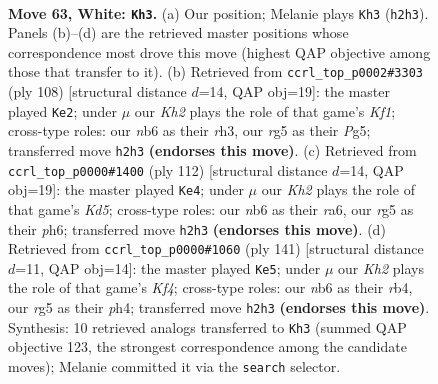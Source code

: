 \documentclass[11pt]{article}
\begin{document}
\clearpage

\begin{figure}[p]\centering
\begin{subfigure}{0.46\textwidth}\centering
\resizebox{\linewidth}{!}{%
\newchessgame
\chessboard[
  setfen={6k1/8/1n6/6rp/p2R4/P7/7K/8 w - - 3 63},
  showmover=false,
  pgfstyle=straightmove, color=movearrow, markmove={h2-h3}
]}
\caption{}
\end{subfigure}\hfill
\begin{subfigure}{0.46\textwidth}\centering
\resizebox{\linewidth}{!}{%
\newchessgame
\chessboard[
  setfen={8/6k1/4R3/6P1/7p/4p2r/8/5K2 w - - 0 55},
  showmover=false,
  pgfstyle=straightmove, color=movearrow, markmove={f1-e2}
]}
\caption{}
\end{subfigure}
\\[4pt]
\begin{subfigure}{0.46\textwidth}\centering
\resizebox{\linewidth}{!}{%
\newchessgame
\chessboard[
  setfen={6k1/8/r4p1p/3K3P/8/5R2/8/8 w - - 0 57},
  showmover=false,
  pgfstyle=straightmove, color=movearrow, markmove={d5-e4}
]}
\caption{}
\end{subfigure}\hfill
\begin{subfigure}{0.46\textwidth}\centering
\resizebox{\linewidth}{!}{%
\newchessgame
\chessboard[
  setfen={8/8/8/5k1p/PR5P/4K3/r7/8 b - - 1 71},
  showmover=false,
  pgfstyle=straightmove, color=movearrow, markmove={f5-e5}
]}
\caption{}
\end{subfigure}
\caption{\textbf{Move 63, White: \texttt{Kh3}.} (a) Our position; Melanie plays \texttt{Kh3} (\texttt{h2h3}). Panels (b)--(d) are the retrieved master positions whose correspondence most drove this move (highest QAP objective among those that transfer to it). (b) Retrieved from \texttt{ccrl\_top\_p0002\#3303} (ply 108) [structural distance $d$=14, QAP obj=19]: the master played \texttt{Ke2}; under $\mu$ our \emph{Kh2} plays the role of that game's \emph{Kf1}; cross-type roles: our \emph{n}b6 as their \emph{r}h3, our \emph{r}g5 as their \emph{P}g5; transferred move \texttt{h2h3} \textbf{(endorses this move)}. (c) Retrieved from \texttt{ccrl\_top\_p0000\#1400} (ply 112) [structural distance $d$=14, QAP obj=19]: the master played \texttt{Ke4}; under $\mu$ our \emph{Kh2} plays the role of that game's \emph{Kd5}; cross-type roles: our \emph{n}b6 as their \emph{r}a6, our \emph{r}g5 as their \emph{p}h6; transferred move \texttt{h2h3} \textbf{(endorses this move)}. (d) Retrieved from \texttt{ccrl\_top\_p0000\#1060} (ply 141) [structural distance $d$=11, QAP obj=14]: the master played \texttt{Ke5}; under $\mu$ our \emph{Kh2} plays the role of that game's \emph{Kf4}; cross-type roles: our \emph{n}b6 as their \emph{r}b4, our \emph{r}g5 as their \emph{p}h4; transferred move \texttt{h2h3} \textbf{(endorses this move)}. Synthesis: 10 retrieved analogs transferred to \texttt{Kh3} (summed QAP objective 123, the strongest correspondence among the candidate moves); Melanie committed it via the \texttt{search} selector.}
\label{fig:thought-m124}
\end{figure}
\end{document}
